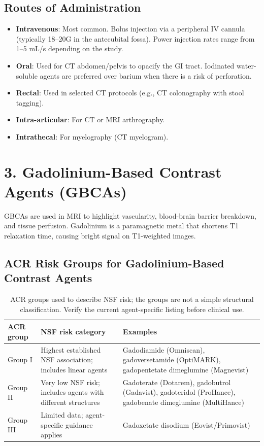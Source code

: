 \subsection*{Routes of Administration}
\begin{itemize}
    \item \textbf{Intravenous}: Most common. Bolus injection via a peripheral IV cannula (typically 18--20G in the antecubital fossa). Power injection rates range from 1--5 mL/s depending on the study.
    \item \textbf{Oral}: Used for CT abdomen/pelvis to opacify the GI tract. Iodinated water-soluble agents are preferred over barium when there is a risk of perforation.
    \item \textbf{Rectal}: Used in selected CT protocols (e.g., CT colonography with stool tagging).
    \item \textbf{Intra-articular}: For CT or MRI arthrography.
    \item \textbf{Intrathecal}: For myelography (CT myelogram).
\end{itemize}


\section*{3. Gadolinium-Based Contrast Agents (GBCAs)}
GBCAs are used in MRI to highlight vascularity, blood-brain barrier breakdown, and tissue perfusion. Gadolinium is a paramagnetic metal that shortens T1 relaxation time, causing bright signal on T1-weighted images.

\subsection*{ACR Risk Groups for Gadolinium-Based Contrast Agents}

\begin{table}[h]
\centering
\caption{ACR groups used to describe NSF risk; the groups are not a simple structural classification. Verify the current agent-specific listing before clinical use.}
\begin{tabular}{|p{}|p{}|p{}|}
\hline
\textbf{ACR group} & \textbf{NSF risk category} & \textbf{Examples} \\
\hline
Group I & Highest established NSF association; includes linear agents & Gadodiamide (Omniscan), gadoversetamide (OptiMARK), gadopentetate dimeglumine (Magnevist) \\
\hline
Group II & Very low NSF risk; includes agents with different structures & Gadoterate (Dotarem), gadobutrol (Gadavist), gadoteridol (ProHance), gadobenate dimeglumine (MultiHance) \\
\hline
Group III & Limited data; agent-specific guidance applies & Gadoxetate disodium (Eovist/Primovist) \\
\hline
\end{tabular}
\end{table}

